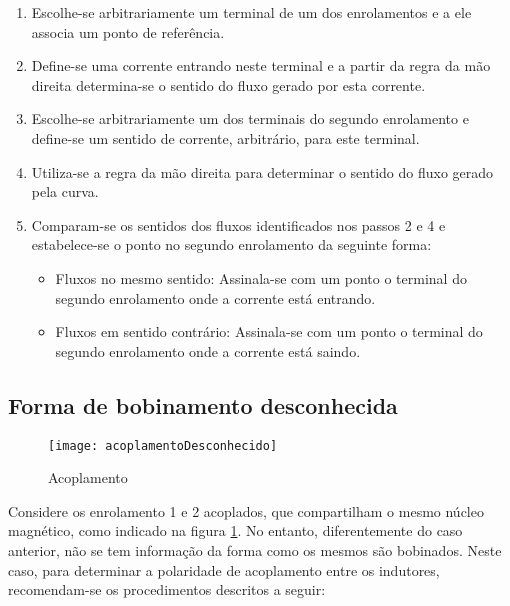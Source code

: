 \documentclass[12pt,fleqn]{book} %
\begin{document}
{    \begin{enumerate}
    \item Escolhe-se arbitrariamente um terminal de um dos enrolamentos e a ele associa um ponto de referência.
    \item Define-se uma corrente entrando neste terminal e a partir da regra da mão direita determina-se o sentido do fluxo gerado por esta corrente.
    \item Escolhe-se arbitrariamente um dos terminais do segundo enrolamento e define-se um sentido de corrente, arbitrário, para este terminal.
    \item Utiliza-se a regra da mão direita para determinar o sentido do fluxo gerado pela curva.
    \item Comparam-se os sentidos dos fluxos identificados nos passos 2 e 4 e estabelece-se o ponto no segundo enrolamento da seguinte forma:
    \begin{itemize}
    \item Fluxos no mesmo sentido: Assinala-se com um ponto o terminal do segundo enrolamento onde a corrente está entrando.
    \item Fluxos em sentido contrário: Assinala-se com um ponto o terminal do segundo enrolamento onde a corrente está saindo.
    \end{itemize}     
    \end{enumerate}
       
    
    \subsection{Forma de bobinamento desconhecida}
    
        \begin{figure}[!htbp] \centering\texttt{[image: acoplamentoDesconhecido]}
            \caption{Acoplamento}\label{acoplamentoDesconhecido} 
        \end{figure}     
    
    Considere os enrolamento 1 e 2 acoplados, que compartilham o mesmo núcleo magnético, como indicado na figura \ref{acoplamentoDesconhecido}. No entanto, diferentemente do caso anterior, não se tem informação da forma como os mesmos são bobinados. Neste caso, para determinar a polaridade de acoplamento entre os indutores, recomendam-se os procedimentos descritos a seguir:
    
}
\end{document}
